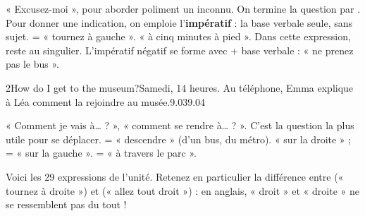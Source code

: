 \begin{comprendre}
  « Excusez-moi », pour aborder poliment un inconnu. On termine
  la question par .
  Pour donner une indication, on emploie
  l'\textbf{impératif} : la base verbale seule, sans sujet.  = « tournez à gauche ».
  « à cinq minutes à pied ». Dans cette expression,
   reste au singulier.
  L'impératif négatif se forme avec  + base
  verbale : « ne prenez pas le bus ».
\end{comprendre}

\begin{dialogue}{2}{How do I get to the museum?}{Samedi, 14 heures. Au téléphone, Emma explique à
  Léa comment la rejoindre au musée.}{9.03}{9.04}
\end{dialogue}

\begin{comprendre}
  « Comment je vais à… ? », « comment se rendre à… ? ».
  C'est la question la plus utile pour se déplacer.  = « descendre » (d'un bus, du métro).
  « sur la droite » ;  = « sur la gauche ».
   = « à travers le parc ».
\end{comprendre}


Voici les 29 expressions de l'unité. Retenez en particulier la différence entre 
(« tournez à droite ») et  (« allez tout droit ») : en anglais, « droit » et
« droite » ne se ressemblent pas du tout !

